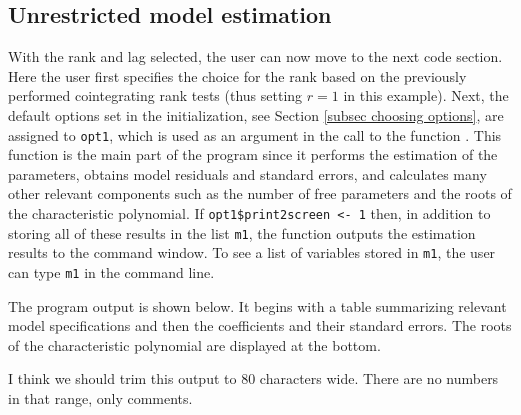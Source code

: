\documentclass[article]{jss}
\newcommand{\fct}[1]{\code{#1()}}
\begin{document}
\subsection{Unrestricted model estimation}

With the rank and lag selected, the user can now move to the next code section. 
% 
% 
Here the user first specifies the choice for the rank based on the previously performed cointegrating rank tests (thus setting $r=1$ in this example). Next, the default options set in the initialization, see Section \ref{subsec choosing options}, are assigned to \verb|opt1|, which is used as an argument in the call to the function \fct{FCVARestn}. This function is the main part of the program since it performs the estimation of the parameters, obtains model residuals and standard errors, and calculates many other relevant components such as the number of free parameters and the roots of the characteristic polynomial. If \verb|opt1$print2screen <- 1| then, in addition to storing all of these results in the list \verb|m1|, the function outputs the estimation results to the command window. To see a list of variables stored in \verb|m1|, the user can type \verb|m1| in the command line. 

The program output is shown below. It begins with a table summarizing relevant model specifications and then the coefficients and their standard errors. The roots of the characteristic polynomial are displayed at the bottom. 

\begin{leftbar}
I think we should trim this output to 80 characters wide. 
There are no numbers in that range, only comments. 
\end{leftbar}
\end{document}
